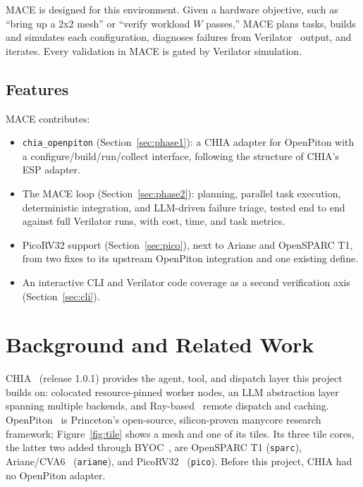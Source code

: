 \documentclass[10pt,conference,compsoc]{IEEEtran}
\newcommand{\code}[1]{\texttt{\small #1}}
\begin{document}
MACE is designed for this environment. Given a hardware objective, such as ``bring up a 2x2 mesh''
or ``verify workload $W$ passes,'' MACE plans tasks, builds and simulates each configuration,
diagnoses failures from Verilator~\cite{verilator} output, and iterates. Every validation in MACE
is gated by Verilator simulation.

\subsection{Features}

MACE contributes:
\begin{itemize}
\item \code{chia\_openpiton} (Section~\ref{sec:phase1}): a CHIA adapter for OpenPiton with a
configure/build/run/collect interface, following the structure of CHIA's ESP adapter.
\item The MACE loop (Section~\ref{sec:phase2}): planning, parallel task execution, deterministic
integration, and LLM-driven failure triage, tested end to end against full Verilator runs, with cost, time, and task metrics.
\item PicoRV32 support (Section~\ref{sec:pico}), next to Ariane and OpenSPARC T1, from two fixes to
its upstream OpenPiton integration and one existing define.
\item An interactive CLI and Verilator code coverage as a second verification axis
(Section~\ref{sec:cli}).
\end{itemize}

\section{Background and Related Work}

CHIA~\cite{chia} (release 1.0.1) provides the agent, tool, and dispatch layer this project builds on: colocated
resource-pinned worker nodes, an LLM abstraction layer spanning multiple backends, and
Ray-based~\cite{ray} remote dispatch and caching. OpenPiton~\cite{openpiton} is Princeton's
open-source, silicon-proven manycore research framework; Figure~\ref{fig:tile} shows a mesh and one
of its tiles. Its three tile cores, the latter two added through BYOC~\cite{byoc}, are OpenSPARC T1
(\code{sparc}), Ariane/CVA6~\cite{cva6} (\code{ariane}), and PicoRV32~\cite{picorv32}
(\code{pico}). Before this project, CHIA had no OpenPiton adapter.
\end{document}
